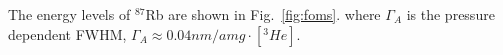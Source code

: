 \documentclass[pdftex,letterpaper,12pt]{report}
\begin{document}
The energy levels of $^{87}$Rb are shown in Fig.~\ref{fig:foms}.
where $\Gamma_{A}$ is the pressure dependent FWHM, $\Gamma_{A}\approx 0.04nm/amg \cdot [^{3}He]$.


\end{document}
